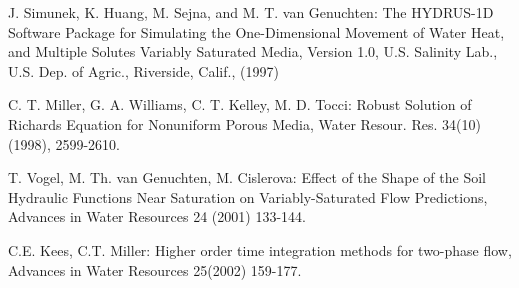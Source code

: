 \documentclass[final,3p,times,twocolumn]{elsarticle}
\begin{document}
\begin{thebibliography}{00}
 J. Simunek, K. Huang, M. Sejna, and M. T. van Genuchten: The HYDRUS-1D Software Package for Simulating the One-Dimensional
Movement of Water Heat, and Multiple Solutes Variably Saturated Media, Version 1.0, U.S. Salinity Lab., U.S. Dep. of Agric.,
Riverside, Calif., (1997)

 C. T. Miller, G. A. Williams, C. T. Kelley, M. D. Tocci: Robust Solution of Richards Equation for Nonuniform Porous Media, Water Resour. Res. 34(10) (1998), 2599-2610.

 T. Vogel, M. Th. van Genuchten, M. Cislerova: Effect of the Shape of the Soil Hydraulic Functions Near Saturation on
Variably-Saturated Flow Predictions, Advances in Water Resources 24 (2001) 133-144.

 C.E. Kees, C.T. Miller: Higher order time integration methods for two-phase flow, Advances in Water Resources 25(2002) 159-177.



 \end{thebibliography}
\end{document}

